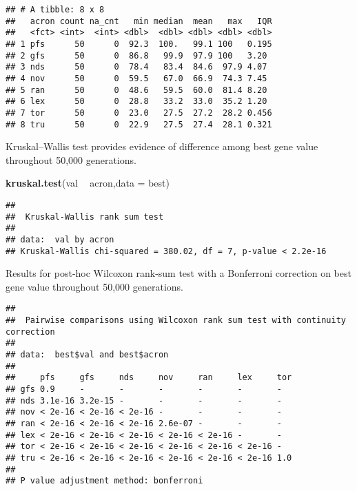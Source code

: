 \documentclass[]{book}
\newenvironment{Shaded}{\begin{snugshade}}{\end{snugshade}}
\newcommand{\DataTypeTok}[1]{\textcolor[rgb]{0.13,0.29,0.53}{#1}}
\newcommand{\KeywordTok}[1]{\textcolor[rgb]{0.13,0.29,0.53}{\textbf{#1}}}
\newcommand{\NormalTok}[1]{#1}
\newcommand{\OperatorTok}[1]{\textcolor[rgb]{0.81,0.36,0.00}{\textbf{#1}}}
\newcommand{\OtherTok}[1]{\textcolor[rgb]{0.56,0.35,0.01}{#1}}
\newcommand{\StringTok}[1]{\textcolor[rgb]{0.31,0.60,0.02}{#1}}
\begin{document}
\begin{verbatim}
## # A tibble: 8 x 8
##   acron count na_cnt   min median  mean   max   IQR
##   <fct> <int>  <int> <dbl>  <dbl> <dbl> <dbl> <dbl>
## 1 pfs      50      0  92.3  100.   99.1 100   0.195
## 2 gfs      50      0  86.8   99.9  97.9 100   3.20 
## 3 nds      50      0  78.4   83.4  84.6  97.9 4.07 
## 4 nov      50      0  59.5   67.0  66.9  74.3 7.45 
## 5 ran      50      0  48.6   59.5  60.0  81.4 8.20 
## 6 lex      50      0  28.8   33.2  33.0  35.2 1.20 
## 7 tor      50      0  23.0   27.5  27.2  28.2 0.456
## 8 tru      50      0  22.9   27.5  27.4  28.1 0.321
\end{verbatim}

Kruskal--Wallis test provides evidence of difference among best gene value throughout 50,000 generations.

\begin{Shaded}
\begin{Highlighting}[]
\KeywordTok{kruskal.test}\NormalTok{(val }\OperatorTok{~}\StringTok{ }\NormalTok{acron,}\DataTypeTok{data =}\NormalTok{ best)}
\end{Highlighting}
\end{Shaded}

\begin{verbatim}
## 
##  Kruskal-Wallis rank sum test
## 
## data:  val by acron
## Kruskal-Wallis chi-squared = 380.02, df = 7, p-value < 2.2e-16
\end{verbatim}

Results for post-hoc Wilcoxon rank-sum test with a Bonferroni correction on best gene value throughout 50,000 generations.

\begin{Shaded}
\end{Shaded}

\begin{verbatim}
## 
##  Pairwise comparisons using Wilcoxon rank sum test with continuity correction 
## 
## data:  best$val and best$acron 
## 
##     pfs     gfs     nds     nov     ran     lex     tor
## gfs 0.9     -       -       -       -       -       -  
## nds 3.1e-16 3.2e-15 -       -       -       -       -  
## nov < 2e-16 < 2e-16 < 2e-16 -       -       -       -  
## ran < 2e-16 < 2e-16 < 2e-16 2.6e-07 -       -       -  
## lex < 2e-16 < 2e-16 < 2e-16 < 2e-16 < 2e-16 -       -  
## tor < 2e-16 < 2e-16 < 2e-16 < 2e-16 < 2e-16 < 2e-16 -  
## tru < 2e-16 < 2e-16 < 2e-16 < 2e-16 < 2e-16 < 2e-16 1.0
## 
## P value adjustment method: bonferroni
\end{verbatim}
\end{document}
